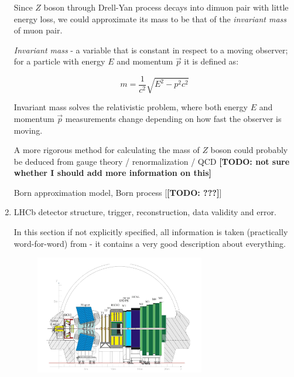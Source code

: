 \documentclass[11pt,a4paper,twoside]{article}
\begin{document}
\begin{enumerate}
        Since $Z$ boson through Drell-Yan process decays into dimuon pair with little energy loss, we could approximate its mass to be that of the \textit{invariant mass} of muon pair.

        \textit{Invariant mass} - a variable that is constant in respect to a moving observer; for a particle with energy $E$ and momentum $\vec{p}$ it is defined as:

        \begin{equation}
            m = \frac{1}{c^2} \sqrt{E^2 - p^2c^2}
            \label{eq:001-invariant-mass}
        \end{equation}

        Invariant mass solves the relativistic problem, where both energy $E$ and momentum $\vec{p}$ measurements change depending on how fast the observer is moving. 

        A more rigorous method for calculating the mass of $Z$ boson could probably be deduced from gauge theory / renormalization / QCD \textbf{[TODO: not sure whether I should add more information on this]}

        Born approximation model, Born process [\textbf{[TODO: ???]}] \cite{khodaverdian2019accuracy}

        

        \item LHCb detector structure, trigger, reconstruction, data validity and error.

        In this section if not explicitly specified, all information is taken (practically word-for-word) from \cite{Bursche:2014ltl} - it contains a very good description about everything.

        \begin{figure}[H]
            \centering

            \includegraphics[width=0.7\textwidth]{visuals/005-LHCb-detector.png}
            

\end{figure}
\end{enumerate}
\end{document}
